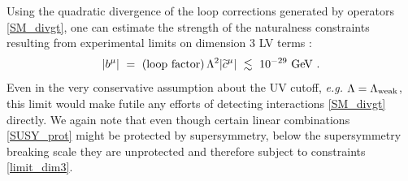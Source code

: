 \documentclass[12pt,preprintnumbers,nofootinbib]{revtex4}
\newcommand{\wt}{\widetilde}
\begin{document}
	
	
Using the quadratic divergence of the loop corrections generated by operators \eqref{SM_divgt},
one can estimate the strength of the naturalness constraints resulting from experimental limits 
on dimension 3 LV terms
\cite{Gagnon:2004xh}:
\begin{equation}
\label{limit_dim3}
	| b^\mu | ~=~ ({\rm loop\ factor})\, 
		\Lambda^2 | \wt{c}^\mu |  ~\lesssim~ 10^{-29}~{\rm GeV}~.
\end{equation}
	Even in the very conservative assumption about the UV cutoff, 
{\it e.g.} $ \Lambda = \Lambda_{\rm weak} $,
	this limit would make futile any efforts of detecting interactions \eqref{SM_divgt}
	directly. 
	We again note that even though certain linear combinations \eqref{SUSY_prot} might
	be protected by supersymmetry, below the supersymmetry breaking 
	scale they are unprotected and therefore subject to constraints \eqref{limit_dim3}. 
	
\end{document}
